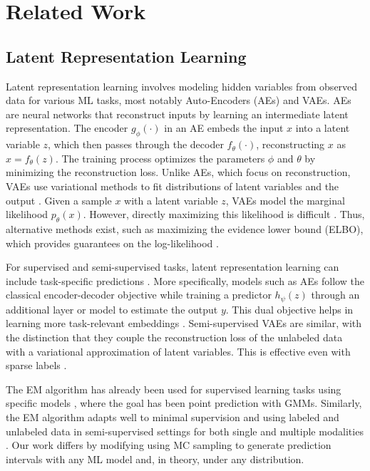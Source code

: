 \documentclass{article}
\begin{document}
\section{Related Work}
\label{related_work}
\subsection{Latent Representation Learning}
Latent representation learning involves modeling hidden variables from observed data for various ML tasks, most notably Auto-Encoders (AEs) and VAEs. AEs are neural networks that reconstruct inputs by learning an intermediate latent representation. The encoder $g_{\phi}(\cdot)$ in an AE embeds the input $x$ into a latent variable $z$, which then passes through the decoder $f_{\theta}(\cdot)$, reconstructing $x$ as $\hat{x}=f_{\theta}(z)$. The training process optimizes the parameters $\phi$ and $\theta$ by minimizing the reconstruction loss. Unlike AEs, which focus on reconstruction, VAEs use variational methods to fit distributions of latent variables and the output \cite{kingma2014vae}. Given a sample $x$ with a latent variable $z$, VAEs model the marginal likelihood $p_\theta(x)$. However, directly maximizing this likelihood is difficult \cite{blei2017vireview}. %
Thus, alternative methods exist, such as maximizing the evidence lower bound (ELBO), which provides guarantees on the log-likelihood \cite{balakrishnan2017emguarantees}.

For supervised and semi-supervised tasks, latent representation learning can include task-specific predictions \cite{kingma2014semi}. More specifically, models such as AEs follow the classical encoder-decoder objective while training a predictor $h_{\psi}(z)$ through an additional layer or model to estimate the output $y$. This dual objective helps in learning more task-relevant embeddings \cite{zhuang2015supervisedautoencoder, le2018supervisedae}. Semi-supervised VAEs are similar, with the distinction that they couple the reconstruction loss of the unlabeled data with a variational approximation of latent variables. This is effective even with sparse labels \cite{ji2020Multisupervisedvae, zhuang2023semi}. 

The EM algorithm has already been used for supervised learning tasks using specific models \cite{ghahramani1993em, williams2005, louiset2021ucsl}, where the goal has been point prediction with GMMs. Similarly, the EM algorithm adapts well to minimal supervision \cite{luo2020weakly} and using labeled and unlabeled data in semi-supervised settings for both single and multiple modalities \cite{he2022semisupem, xu2024expectation}. Our work differs by modifying using MC sampling to generate prediction intervals with any ML model and, in theory, under any distribution.
\end{document}
